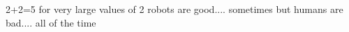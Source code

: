 2+2=5 for very large values of 2
robots are good.... sometimes
but humans are bad.... all of the time

